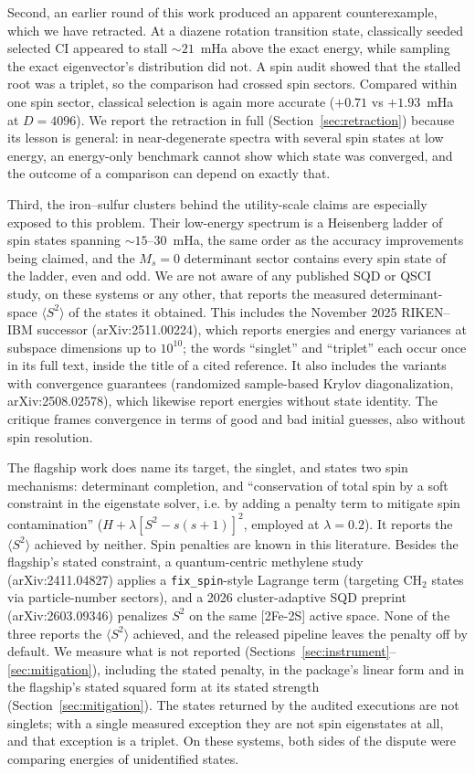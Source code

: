 \documentclass[11pt]{article}
\newcommand{\ssq}{\ensuremath{\langle S^2\rangle}}
\begin{document}
Second, an earlier round of this work produced an apparent counterexample, which we have retracted. At a diazene rotation transition state, classically seeded selected CI appeared to stall ${\sim}21$~mHa above the exact energy, while sampling the exact eigenvector's distribution did not. A spin audit showed that the stalled root was a triplet, so the comparison had crossed spin sectors. Compared within one spin sector, classical selection is again more accurate ($+0.71$ vs $+1.93$~mHa at $D=4096$). We report the retraction in full (Section~\ref{sec:retraction}) because its lesson is general: in near-degenerate spectra with several spin states at low energy, an energy-only benchmark cannot show which state was converged, and the outcome of a comparison can depend on exactly that.

Third, the iron--sulfur clusters behind the utility-scale claims are especially exposed to this problem. Their low-energy spectrum is a Heisenberg ladder of spin states spanning ${\sim}15$--$30$~mHa, the same order as the accuracy improvements being claimed, and the $M_s=0$ determinant sector contains every spin state of the ladder, even and odd. We are not aware of any published SQD or QSCI study, on these systems or any other, that reports the measured determinant-space \ssq{} of the states it obtained. This includes the November 2025 RIKEN--IBM successor (arXiv:2511.00224), which reports energies and energy variances at subspace dimensions up to $10^{10}$; the words ``singlet'' and ``triplet'' each occur once in its full text, inside the title of a cited reference. It also includes the variants with convergence guarantees (randomized sample-based Krylov diagonalization, arXiv:2508.02578), which likewise report energies without state identity. The critique frames convergence in terms of good and bad initial guesses, also without spin resolution.

The flagship work does name its target, the singlet, and states two spin mechanisms: determinant completion, and ``conservation of total spin by a soft constraint in the eigenstate solver, i.e. by adding a penalty term to mitigate spin contamination'' ($H+\lambda[S^2-s(s+1)]^2$, employed at $\lambda=0.2$). It reports the \ssq{} achieved by neither. Spin penalties are known in this literature. Besides the flagship's stated constraint, a quantum-centric methylene study (arXiv:2411.04827) applies a \texttt{fix\_spin}-style Lagrange term (targeting CH$_2$ states via particle-number sectors), and a 2026 cluster-adaptive SQD preprint (arXiv:2603.09346) penalizes $S^2$ on the same [2Fe-2S] active space. None of the three reports the \ssq{} achieved, and the released pipeline leaves the penalty off by default. We measure what is not reported (Sections~\ref{sec:instrument}--\ref{sec:mitigation}), including the stated penalty, in the package's linear form and in the flagship's stated squared form at its stated strength (Section~\ref{sec:mitigation}). The states returned by the audited executions are not singlets; with a single measured exception they are not spin eigenstates at all, and that exception is a triplet. On these systems, both sides of the dispute were comparing energies of unidentified states.
\end{document}
